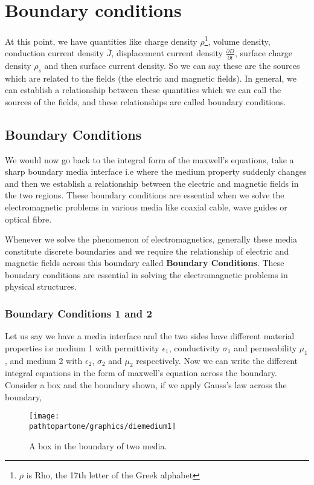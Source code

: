 \chapter{Boundary conditions}\label{lec:lec20}

At this point, we have quantities like charge density $\rho$\footnote[1]{$\rho$ is Rho, the 17th letter of the Greek alphabet}, volume density, conduction current density $\overline{J}$, displacement current density $\frac{\partial \overline{D}}{\partial t}$, surface charge density $\rho_s$ and then surface current density. So we can say these are the sources which are related to the fields (the electric and magnetic fields). In general, we can establish a relationship between these quantities which we can call the sources of the fields, and these relationships are called boundary conditions.

\section{Boundary Conditions}

We would now go back to the integral form of the maxwell's equations, take a sharp boundary media interface i.e where the medium property suddenly changes and then we establish a relationship between the electric and magnetic fields in the two regions. These boundary conditions are essential when we solve the electromagnetic problems in various media like coaxial cable, wave guides or optical fibre.

Whenever we solve the phenomenon of electromagnetics, generally these media constitute discrete boundaries and we require the relationship of electric and magnetic fields across this boundary called \textbf{Boundary Conditions}. These boundary conditions are essential in solving the electromagnetic problems in physical structures.

\subsection{Boundary Conditions 1 and 2}
Let us say we have a media interface and the two sides have different material properties i.e medium 1 with permittivity $\epsilon_1$, conductivity $\sigma_1$ and permeability $\mu_1$, and medium 2 with $\epsilon_2$, $\sigma_2$ and $\mu_2$ respectively. Now we can write the different integral equations in the form of maxwell's equation across the boundary. Consider a box and the boundary shown, if we apply Gauss's law across the boundary,
\begin{figure}[h]
\centering
\texttt{[image: \\pathtopartone/graphics/diemedium1]}
\caption{A box in the boundary of two media.}
\end{figure}

